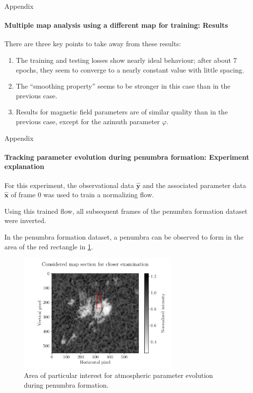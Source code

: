 \documentclass{beamer}
\newcommand\matr[1]{\ensuremath{\boldsymbol{\mathbf{#1}}}}
\begin{document}
\begin{frame}[allowframebreaks]{Appendix}
	\vspace{-0.4cm}
	\framesubtitle{Multiple map analysis using a different map for training: Results} 
	There are three key points to take away from these results:
	\begin{enumerate}
		\item The training and testing losses show nearly ideal behaviour; after about 7 epochs, they seem to converge to a nearly constant value with little spacing.
		\item The ``smoothing property'' seems to be stronger in this case than in the previous case.
		\item Results for magnetic field parameters are of similar quality than in the previous case, except for the azimuth parameter $\varphi$.
	\end{enumerate}
\end{frame}

\begin{frame}[allowframebreaks]{Appendix}
	\framesubtitle{Tracking parameter evolution during penumbra formation: Experiment explanation} %
	For this experiment, the observational data $\hat{\matr{y}}$ and the associated parameter data $\hat{\matr{x}}$ of frame 0 was used to train a normalizing flow.
	
	Using this trained flow, all subsequent frames of the penumbra formation dataset were inverted.
	
	In the penumbra formation dataset, a penumbra can be observed to form in the area of the red rectangle in \cref{fig:nf-milne-eddington-example-7-considered-map-section-nflows-piecewisequadratic}.
	
	\begin{figure}[h!]
		\centering
		\includegraphics[width=8cm]{figures/thesis/nf-milne-eddington-example-7-considered-map-section-nflows-piecewisequadratic.pdf}
		\caption{Area of particular interest for atmospheric parameter evolution during penumbra formation.}
		\label{fig:nf-milne-eddington-example-7-considered-map-section-nflows-piecewisequadratic}
	\end{figure}
\end{frame}
\end{document}
